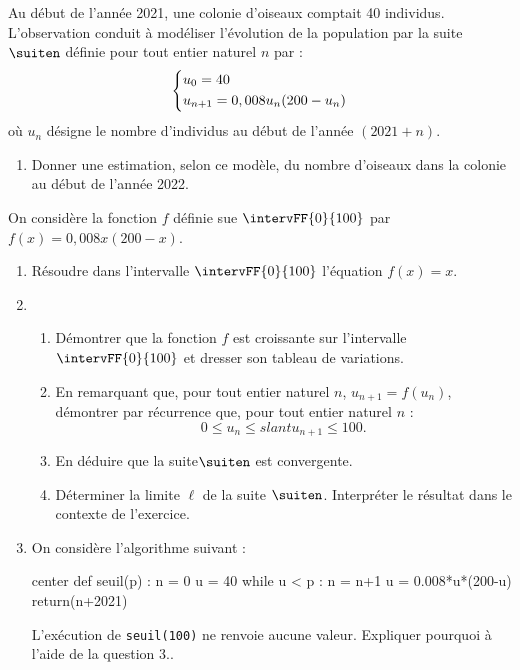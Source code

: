 Au début de l'année 2021, une colonie d'oiseaux comptait 40 individus. L'observation
conduit à modéliser l'évolution de la population par la suite $\suiten$ définie pour tout entier naturel $n$ par : \[ \begin{dcases} u_0 = 40 \\ u_{n+1} = 0,008u_n(200-u_n) \end{dcases} \]%
où $u_n$ désigne le nombre d'individus au début de l'année $(2021+n)$.

\begin{enumerate}
	\item Donner une estimation, selon ce modèle, du nombre d'oiseaux dans la colonie au début de l'année 2022.
\end{enumerate}

On considère la fonction $f$ définie sue $\intervFF{0}{100}$ par $f(x)=0,008x(200-x)$.

\begin{enumerate}[resume]
	\item Résoudre dans l'intervalle $\intervFF{0}{100}$ l'équation $f(x)= x$.
	\item 
	\begin{enumerate}
		\item Démontrer que la fonction $f$ est croissante sur l'intervalle $\intervFF{0}{100}$ et dresser son tableau de variations.
		\item En remarquant que, pour tout entier naturel $n$, $u_{n+1}=f(u_n)$, démontrer par récurrence que, pour tout entier naturel $n$ : \[ 0 \leqslant u_n \leq slantu_{n+1} \leqslant 100.\]
		\item En déduire que la suite$\suiten$ est convergente.
		\item Déterminer la limite $\ell$ de la suite $\suiten$. Interpréter le résultat dans le contexte de l'exercice.
	\end{enumerate}
	\item On considère l'algorithme suivant :
	
\begin{CodePythonLstAlt}[Largeur=10cm]{center}
def seuil(p) : 
	n = 0
	u = 40
	while u < p :
		n = n+1
		u = 0.008*u*(200-u)
	return(n+2021)
\end{CodePythonLstAlt}
	
	L'exécution de \texttt{seuil(100)} ne renvoie aucune valeur. Expliquer pourquoi à
	l'aide de la question 3..
\end{enumerate}

